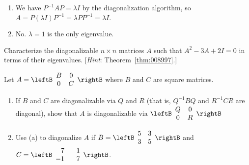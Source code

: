 \begin{multicols}{2}
\begin{ex}
\begin{enumerate}[label={\alph*.}]
\end{enumerate}
\begin{sol}
\begin{enumerate}[label={\alph*.}]
\item  We have $P^{-1}AP = \lambda I$ by the diagonalization algorithm, so $A = P(\lambda I)P^{-1} = \lambda PP^{-1} = \lambda I$.

\item  No. $\lambda = 1$ is the only eigenvalue.

\end{enumerate}
\end{sol}
\end{ex}

\begin{ex}
Characterize the diagonalizable $n \times n$ matrices $A$ such that $A^{2} - 3A + 2I = 0$ in terms of their eigenvalues. [\textit{Hint}: Theorem~\ref{thm:008997}.]
\end{ex}

\begin{ex}
Let $A = \leftB \begin{array}{cc}
B & 0 \\
0 & C 
\end{array}\rightB$
 where $B$ and $C$ are square matrices.


\begin{enumerate}[label={\alph*.}]
\item If $B$ and $C$ are diagonalizable via $Q$ and $R$ (that is, $Q^{-1}BQ$ and $R^{-1}CR$ are diagonal), show that $A$ is diagonalizable via $\leftB \begin{array}{cc}
Q & 0 \\
0 & R 
\end{array}\rightB$


\item Use (a) to diagonalize $A$ if $B = \leftB \begin{array}{rr}
5 & 3 \\
3 & 5 
\end{array}\rightB$
 and $C = \leftB \begin{array}{rr}
7 & -1 \\
-1 & 7 
\end{array}\rightB$.


\end{enumerate}
\end{ex}


\end{multicols}








